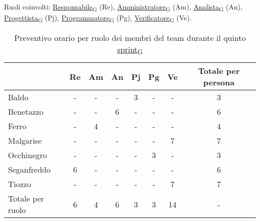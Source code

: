 Ruoli coinvolti: \href{https://7last.github.io/docs/rtb/documentazione-interna/glossario\#responsabile}{Responsabile\textsubscript{G}} (Re), \href{https://7last.github.io/docs/rtb/documentazione-interna/glossario\#amministratore}{Amministratore\textsubscript{G}} (Am), \href{https://7last.github.io/docs/rtb/documentazione-interna/glossario\#analista}{Analista\textsubscript{G}} (An), \href{https://7last.github.io/docs/rtb/documentazione-interna/glossario\#progettista}{Progettista\textsubscript{G}} (Pj), \href{https://7last.github.io/docs/rtb/documentazione-interna/glossario\#programmatore}{Programmatore\textsubscript{G}} (Pg), \href{https://7last.github.io/docs/rtb/documentazione-interna/glossario\#verificatore}{Verificatore\textsubscript{G}} (Ve).
\begin{table}[!h]
    \centering
    \begin{tabular}{ | l | c | c | c | c | c | c | c | }
        \hline
        \textbf{} & \textbf{Re} & \textbf{Am} &\textbf{An} & \textbf{Pj} & \textbf{Pg} & \textbf{Ve} & \textbf{Totale per persona} \\
        \hline
        Baldo            &  -   &  -   &  -   &  3   &  -   &  -   &  3   \\
        Benetazzo        &  -   &  -   &  6   &  -   &  -   &  -   &  6   \\
        Ferro            &  -   &  4   &  -   &  -   &  -   &  -   &  4   \\
        Malgarise        &  -   &  -   &  -   &  -   &  -   &  7   &  7   \\
        Occhinegro       &  -   &  -   &  -   &  -   &  3   &  -   &  3   \\
        Seganfreddo      &  6   &  -   &  -   &  -   &  -   &  -   &  6   \\
        Tiozzo           &  -   &  -   &  -   &  -   &  -   &  7   &  7   \\
        \hline
        Totale per ruolo &  6   &  4   &  6   &  3   &  3   &  14  &  -   \\
        \hline
    \end{tabular}
    \caption{Preventivo orario per ruolo dei membri del team durante il quinto \href{https://7last.github.io/docs/rtb/documentazione-interna/glossario\#sprint}{sprint\textsubscript{G}}} 
\end{table}

